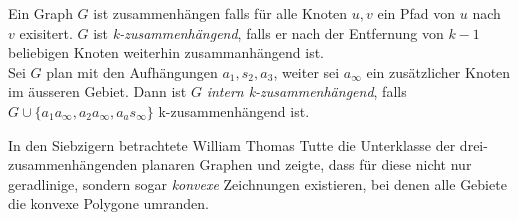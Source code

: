 \begin{definition}\label{int_3_con}
Ein Graph $G$ ist zusammenhängen falls für alle Knoten $u,v$ ein Pfad von $u$ nach $v$ exisitert. $G$ ist \textit{k-zusammenhängend}, falls er nach der Entfernung von $k-1$ beliebigen Knoten weiterhin zusammanhängend ist.\\
Sei $G$ plan mit den Aufhängungen $a_1,s_2,a_3$, weiter sei $a_\infty$ ein zusätzlicher Knoten im äusseren Gebiet. Dann ist $G$ \textit{intern k-zusammenhängend}, falls $G \cup \{ a_1a_\infty,a_2a_\infty,a_as_\infty \}$ k-zusammenhängend ist. 
\end{definition}

In den Siebzigern betrachtete William Thomas Tutte die Unterklasse der drei-zusammenhängenden planaren Graphen und zeigte, dass für diese nicht nur geradlinige, sondern sogar \textit{konvexe} Zeichnungen existieren, bei denen alle Gebiete die konvexe Polygone umranden. \cite{tutte63}
